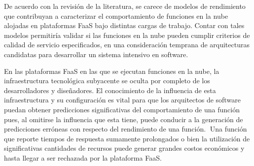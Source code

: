 De acuerdo con la revisión de la literatura, se carece de modelos de rendimiento que contribuyan a caracterizar el comportamiento de funciones en la nube alojadas en plataformas FaaS bajo distintas cargas de trabajo. Contar con tales modelos permitiría validar si las funciones en la nube pueden cumplir criterios de calidad de servicio especificados, en una consideración temprana de arquitecturas candidatas para desarrollar un sistema intensivo en software.

En las plataformas FaaS en las que se ejecutan funciones en la nube, la infraestructura tecnológica subyacente se oculta por completo de los desarrolladores y diseñadores. El conocimiento de la influencia de esta infraestructura y su configuración es vital para que los arquitectos de software puedan obtener predicciones significativas del comportamiento de una función pues, al omitirse la influencia que esta tiene, puede conducir a la generación de predicciones erróneas con respecto del rendimiento de una función. Una función que reporte tiempos de respuesta sumamente prolongados o bien la utilización de significativas cantidades de recursos puede generar grandes costos económicos y hasta llegar a ser rechazada por la plataforma FaaS.
